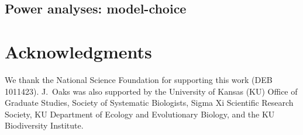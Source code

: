 \documentclass[letterpaper,12pt]{article}
\begin{document}
\begin{linenumbers}
\subsection*{Power analyses: model-choice}

\section*{Acknowledgments}
We thank the National Science Foundation for supporting this work (DEB
1011423).
J.\ Oaks was also supported by the University of Kansas (KU) Office of Graduate
Studies, Society of Systematic Biologists, Sigma Xi Scientific Research
Society, KU Department of Ecology and Evolutionary Biology, and the KU
Biodiversity Institute.



\newpage
\singlespacing

\renewcommand\listfigurename{Figure Captions}
\renewcommand\cftdotsep{\cftnodots}
\setlength\cftbeforefigskip{10pt}
\listoffigures


\end{linenumbers}

\newpage
\singlespacing
\end{document}
